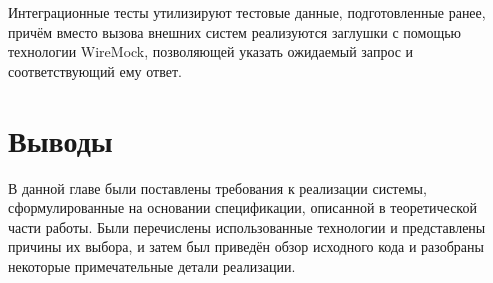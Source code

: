 Интеграционные тесты утилизируют тестовые данные, подготовленные ранее, %
причём вместо вызова внешних систем реализуются заглушки с помощью технологии WireMock, позволяющей указать ожидаемый запрос и соответствующий ему ответ.


\section{Выводы} \label{sec:ch3-conclusion}

В данной главе были поставлены требования к реализации системы, сформулированные на основании спецификации, описанной в теоретической части работы.
Были перечислены использованные технологии и представлены причины их выбора, и затем был приведён обзор исходного кода и разобраны некоторые примечательные детали реализации.
